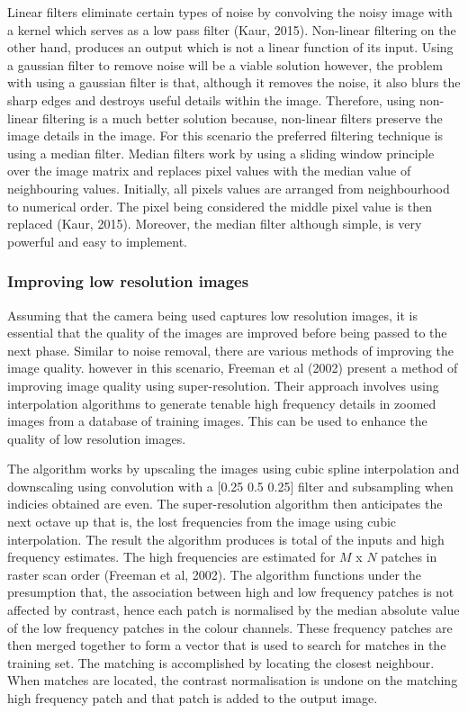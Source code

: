 \documentclass[a4paper, 12pt]{article}
\begin{document}
Linear filters eliminate certain types of noise by convolving the noisy image with a kernel which serves as a low pass filter (Kaur, 2015). Non-linear filtering on the other hand, produces an output which is not a linear function of its input. Using a gaussian filter to remove noise will be a viable solution however, the problem with using a gaussian filter is that, although it removes the noise, it also blurs the sharp edges and destroys useful details within the image. Therefore, using non-linear filtering is a much better solution because, non-linear filters preserve the image details in the image. For this scenario the preferred filtering technique is using a median filter. Median filters work by using a sliding window principle over the image matrix and replaces pixel values with the median value of neighbouring values. Initially, all pixels values are arranged from neighbourhood to numerical order. The pixel being considered the middle pixel value is then replaced (Kaur, 2015). Moreover, the median filter although simple, is very powerful and easy to implement. 

\subsubsection{Improving low resolution images}

Assuming that the camera being used captures low resolution images, it is essential that the quality of the images are improved before being passed to the next phase. Similar to noise removal, there are various methods of improving the image quality. however in this scenario, Freeman et al (2002) present a method of improving image quality using super-resolution. Their approach involves using interpolation algorithms to generate tenable high frequency details in zoomed images from a database of training images. This can be used to enhance the quality of low resolution images. 
\parskip 0.2in

The algorithm works by upscaling the images using cubic spline interpolation and downscaling using convolution with a [0.25 0.5 0.25] filter and subsampling
when indicies obtained are even. The super-resolution algorithm then anticipates the next octave up that is, the lost frequencies from the image using cubic interpolation. The result the algorithm produces is total of the inputs and high frequency estimates. The high frequencies are estimated for $M$ x $N$ patches in raster scan order (Freeman et al, 2002). The algorithm functions under the presumption that, the association between high and low frequency patches is not affected by contrast, hence each patch is normalised by the median absolute value of the low frequency patches in the colour channels. These frequency patches are then merged together to form a vector that is used to search for matches in the training set. The matching is accomplished by locating the closest neighbour. When matches are located, the contrast normalisation is undone on the matching high frequency patch and that patch is added to the output image.  
\end{document}
